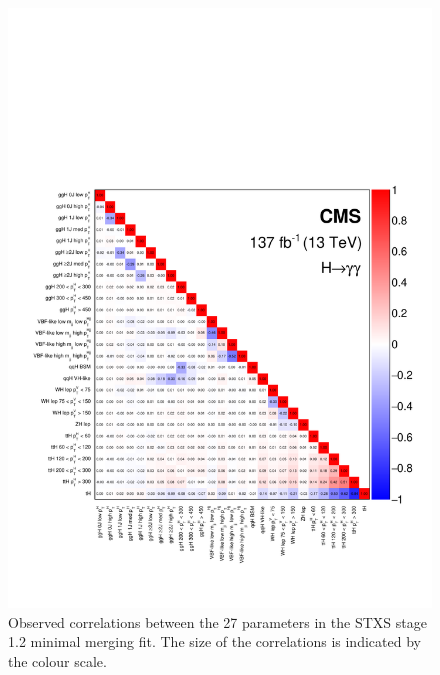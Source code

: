 
\begin{figure}[htbp]
  \centering
  \includegraphics[width=.93\textwidth]{Figures/hgg_results/stage1p2_minimal_correlations.pdf}
  \caption[Correlations in the STXS stage 1.2 minimal merging parameters]
  {
    Observed correlations between the 27 parameters in the STXS stage 1.2 minimal merging fit. The size of the correlations is indicated by the colour scale.
  }
  \label{fig:stage1p2_minimal_correlations}
\end{figure}


